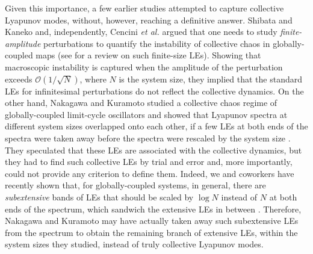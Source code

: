 \documentclass[12pt]{iopart}
\begin{document}
Given this importance,
 a few earlier studies attempted to capture collective Lyapunov modes,
 without, however, reaching a definitive answer.
Shibata and Kaneko \cite{Shibata.Kaneko-PRL1998}
 and, independently, Cencini \textit{et al.} \cite{Cencini.etal-PD1999}
 argued that one needs to study \textit{finite-amplitude} perturbations
 to quantify the instability of collective chaos in globally-coupled maps
 (see \cite{Cencini.Vulpiani-JPA2012} for a review on such finite-size LEs).
Showing that macroscopic instability is captured
 when the amplitude of the perturbation exceeds $\mathcal{O}(1/\sqrt{N})$,
 where $N$ is the system size,
 they implied that the standard LEs for infinitesimal perturbations
 do not reflect the collective dynamics.
On the other hand, Nakagawa and Kuramoto
 studied a collective chaos regime of globally-coupled limit-cycle oscillators
 and showed that Lyapunov spectra at different system sizes
 overlapped onto each other, if a few LEs
 at both ends of the spectra
 were taken away before the spectra were rescaled by the system size
 \cite{Nakagawa.Kuramoto-PD1995}.
They speculated that these LEs are associated with the collective dynamics,
 but they had to find such collective LEs by trial and error
 and, more importantly, could not provide any criterion to define them.
Indeed, we and coworkers have recently shown that,
 for globally-coupled systems, in general,
 there are \textit{subextensive} bands of LEs
 that should be scaled by $\log N$ instead of $N$
 at both ends of the spectrum,
 which sandwich the extensive LEs in between \cite{Takeuchi.etal-PRL2011}.
Therefore, Nakagawa and Kuramoto may have actually taken away
 such subextensive LEs from the spectrum to obtain the remaining branch
 of extensive LEs, within the system sizes they studied,
 instead of truly collective Lyapunov modes.
\end{document}
